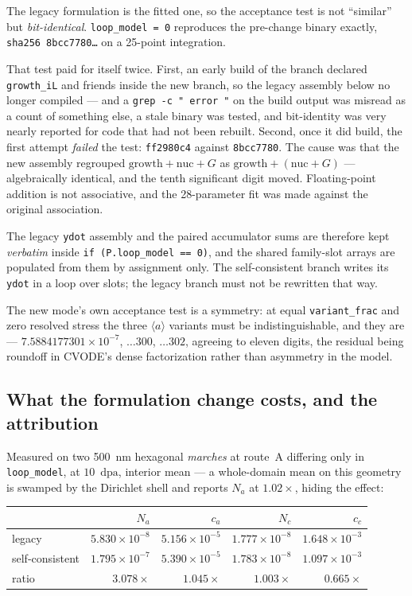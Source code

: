 \documentclass[11pt,a4paper]{article}
\newcommand{\code}[1]{\texttt{\small #1}}
\newcommand{\dpa}{\ensuremath{\mathrm{dpa}}}
\newcommand{\aloop}{\ensuremath{\langle a\rangle}}
\begin{document}
The legacy formulation is the fitted one, so the acceptance test is not
``similar'' but \emph{bit-identical}. \code{loop\_model = 0} reproduces the
pre-change binary exactly, \code{sha256 8bcc7780\ldots} on a 25-point
integration.

That test paid for itself twice. First, an early build of the branch declared
\code{growth\_iL} and friends inside the new branch, so the legacy assembly
below no longer compiled --- and a \code{grep -c " error "} on the build output
was misread as a count of something else, a stale binary was tested, and
bit-identity was very nearly reported for code that had not been rebuilt.
Second, once it did build, the first attempt \emph{failed} the test:
\code{ff2980c4} against \code{8bcc7780}. The cause was that the new assembly
regrouped $\text{growth} + \text{nuc} + G$ as
$\text{growth} + (\text{nuc} + G)$ --- algebraically identical, and the tenth
significant digit moved. Floating-point addition is not associative, and the
28-parameter fit was made against the original association.

The legacy \code{ydot} assembly and the paired accumulator sums are therefore
kept \emph{verbatim} inside \code{if (P.loop\_model == 0)}, and the shared
family-slot arrays are populated from them by assignment only. The
self-consistent branch writes its \code{ydot} in a loop over slots; the legacy
branch must not be rewritten that way.

The new mode's own acceptance test is a symmetry: at equal
\code{variant\_frac} and zero resolved stress the three \aloop{} variants must
be indistinguishable, and they are --- $7.5884177301\times10^{-7}$,
$\ldots300$, $\ldots302$, agreeing to eleven digits, the residual being
roundoff in CVODE's dense factorization rather than asymmetry in the model.

\subsection{What the formulation change costs, and the attribution}

Measured on two 500~nm hexagonal \emph{marches} at route~A differing only in
\code{loop\_model}, at $10$~\dpa, interior mean --- a whole-domain mean on this
geometry is swamped by the Dirichlet shell and reports $N_a$ at $1.02\times$,
hiding the effect:

\begin{center}
\begin{tabular}{@{}lrrrr@{}}
\toprule
 & $N_a$ & $c_a$ & $N_c$ & $c_c$ \\
\midrule
legacy          & $5.830\times10^{-8}$ & $5.156\times10^{-5}$ & $1.777\times10^{-8}$ & $1.648\times10^{-3}$ \\
self-consistent & $1.795\times10^{-7}$ & $5.390\times10^{-5}$ & $1.783\times10^{-8}$ & $1.097\times10^{-3}$ \\
ratio           & $\mathbf{3.078\times}$ & $1.045\times$ & $1.003\times$ & $\mathbf{0.665\times}$ \\
\bottomrule
\end{tabular}
\end{center}
\end{document}
